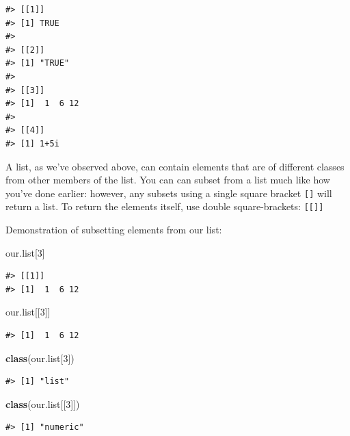 \documentclass[]{article}
\newenvironment{Shaded}{\begin{snugshade}}{\end{snugshade}}
\newcommand{\DecValTok}[1]{\textcolor[rgb]{0.00,0.00,0.81}{#1}}
\newcommand{\KeywordTok}[1]{\textcolor[rgb]{0.13,0.29,0.53}{\textbf{#1}}}
\newcommand{\NormalTok}[1]{#1}
\begin{document}
\begin{verbatim}
#> [[1]]
#> [1] TRUE
#> 
#> [[2]]
#> [1] "TRUE"
#> 
#> [[3]]
#> [1]  1  6 12
#> 
#> [[4]]
#> [1] 1+5i
\end{verbatim}

A list, as we've observed above, can contain elements that are of
different classes from other members of the list. You can can subset
from a list much like how you've done earlier: however, any subsets
using a single square bracket \texttt{{[}{]}} will return a list. To
return the elements itself, use double square-brackets:
\texttt{{[}{[}{]}{]}}

Demonstration of subsetting elements from our list:

\begin{Shaded}
\begin{Highlighting}[]
\NormalTok{our.list[}\DecValTok{3}\NormalTok{]}
\end{Highlighting}
\end{Shaded}

\begin{verbatim}
#> [[1]]
#> [1]  1  6 12
\end{verbatim}

\begin{Shaded}
\begin{Highlighting}[]
\NormalTok{our.list[[}\DecValTok{3}\NormalTok{]]}
\end{Highlighting}
\end{Shaded}

\begin{verbatim}
#> [1]  1  6 12
\end{verbatim}

\begin{Shaded}
\begin{Highlighting}[]
\KeywordTok{class}\NormalTok{(our.list[}\DecValTok{3}\NormalTok{])}
\end{Highlighting}
\end{Shaded}

\begin{verbatim}
#> [1] "list"
\end{verbatim}

\begin{Shaded}
\begin{Highlighting}[]
\KeywordTok{class}\NormalTok{(our.list[[}\DecValTok{3}\NormalTok{]])}
\end{Highlighting}
\end{Shaded}

\begin{verbatim}
#> [1] "numeric"
\end{verbatim}
\end{document}
